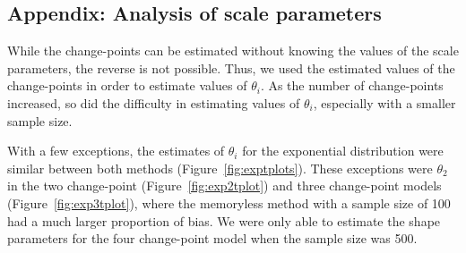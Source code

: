 \begin{appendix}

\section{Appendix: Analysis of scale parameters}

While the change-points can be estimated without knowing the values of the scale parameters, the reverse is not possible. Thus, we used the estimated values of the change-points in order to estimate values of $\theta_i$. As the number of change-points increased, so did the difficulty in estimating values of $\theta_i$, especially with a smaller sample size. 

With a few exceptions, the estimates of $\theta_i$ for the exponential distribution were similar between both methods (Figure~\ref{fig:exptplots}). These exceptions were $\theta_2$ in the two change-point (Figure~\ref{fig:exp2tplot}) and three change-point models (Figure~\ref{fig:exp3tplot}), where the memoryless method with a sample size of 100 had a much larger proportion of bias. We were only able to estimate the shape parameters for the four change-point model when the sample size was 500.


\end{appendix}
